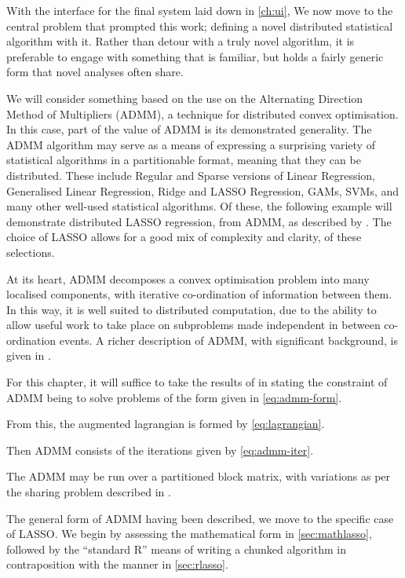 With the interface for the final system laid down in \cref{ch:ui}, We now move to the central problem that prompted this work; defining a novel distributed statistical algorithm with it.
Rather than detour with a truly novel algorithm, it is preferable to engage with something that is familiar, but holds a fairly generic form that novel analyses often share.

We will consider something based on the use on the Alternating Direction Method of Multipliers (ADMM), a technique for distributed convex optimisation.
In this case, part of the value of ADMM is its demonstrated generality.
The ADMM algorithm may serve as a means of expressing a surprising variety of statistical algorithms in a partitionable format, meaning that they can be distributed.
These include Regular and Sparse versions of Linear Regression, Generalised Linear Regression, Ridge and LASSO Regression, GAMs, SVMs, and many other well-used statistical algorithms.
Of these, the following example will demonstrate distributed LASSO regression, from ADMM, as described by \textcite{mateos2010}.
The choice of LASSO allows for a good mix of complexity and clarity, of these selections.

At its heart, ADMM decomposes a convex optimisation problem into many localised components, with iterative co-ordination of information between them.
In this way, it is well suited to distributed computation, due to the ability to allow useful work to take place on subproblems made independent in between co-ordination events.
A richer description of ADMM, with significant background, is given in \textcite{boyd2011}.

For this chapter, it will suffice to take the results of \textcite{boyd2011} in stating the constraint of ADMM being to solve problems of the form given in \cref{eq:admm-form}.


From this, the augmented lagrangian is formed by \cref{eq:lagrangian}.


Then ADMM consists of the iterations given by \cref{eq:admm-iter}.


The ADMM may be run over a partitioned block matrix, with variations as per the sharing problem described in \textcite{boyd2011}.

The general form of ADMM having been described, we move to the specific case of LASSO.
We begin by assessing the mathematical form in \cref{sec:mathlasso}, followed by the ``standard R'' means of writing a chunked algorithm in contraposition with the \lsr{} manner in \cref{sec:rlasso}.

